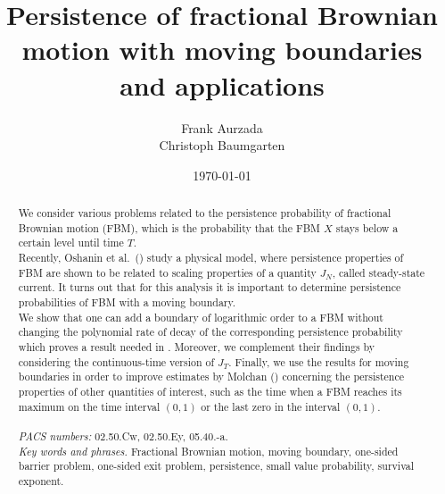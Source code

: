 \documentclass[11pt]{article}
\theoremstyle{plain}
\theoremstyle{definition}
\begin{document}
\title{{\sc Persistence of fractional Brownian motion with moving boundaries and applications }}
\author{ {\sc Frank Aurzada}\footnotemark[1]\\
{\sc Christoph Baumgarten}\footnotemark[1]}
\date{\today}

\maketitle

\begin{abstract}
\noindent
We consider various problems related to the persistence probability of fractional Brownian motion (FBM), which is the probability that the FBM $X$ stays below a certain level until time $T$.\\
Recently, Oshanin et al.\ (\cite{o-r-s:2012}) study a physical model, where persistence properties of FBM are shown to be related to scaling properties of a quantity $J_N$, called steady-state current. It turns out that for this analysis it is important to determine persistence probabilities of FBM with a moving boundary.\\
We show that one can add a boundary of logarithmic order to a FBM without changing the polynomial rate of decay of the corresponding persistence probability which proves a result needed in \cite{o-r-s:2012}. Moreover, we complement their findings by considering the continuous-time version of $J_T$. Finally, we use the results for moving boundaries in order to improve estimates by Molchan (\cite{molchan:1999a}) concerning the persistence properties of other quantities of interest, such as the time when a FBM reaches its maximum on the time interval $(0,1)$ or the last zero in the interval $(0,1)$.  \\ \\
\noindent
{\it PACS numbers:} 02.50.Cw, 02.50.Ey, 05.40.-a. \\

\noindent
{\it Key words and phrases.} Fractional Brownian motion, moving boundary, one-sided barrier problem, one-sided exit problem, persistence, small value probability, survival exponent.\\
\end{abstract}
\end{document}
